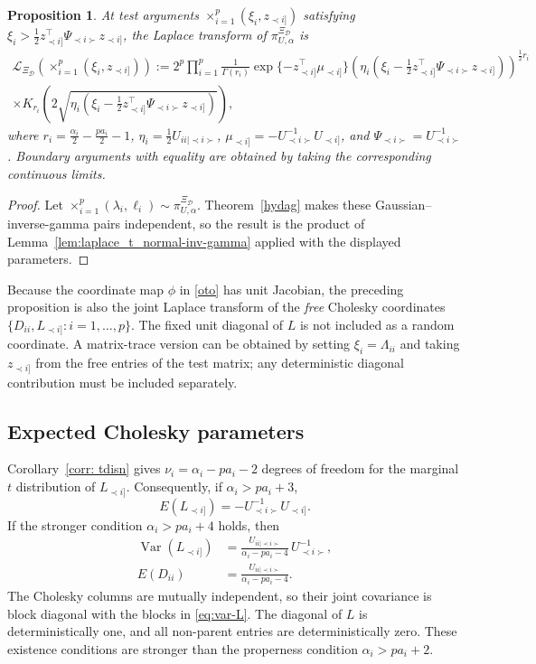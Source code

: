 \documentclass[12pt]{article}
\newcommand{\D}{\mathcal{D}}
\theoremstyle{plain}
\newtheorem{proposition}[theorem]{Proposition}
\theoremstyle{definition}
\theoremstyle{remark}
\begin{document}
\begin{proposition}
At test arguments \(\times_{i=1}^{p}(\xi_i,z_{\prec i]})\) satisfying
\(\xi_i>\tfrac12z_{\prec i]}^\top\Psi_{\prec i\succ}z_{\prec i]}\),
the Laplace transform of $\pi^{\Xi_{\D}}_{U,\alpha}$ is
\begin{eqnarray}
\mathcal{L}_{\Xi_{\D}}(\times_{i=1}^{p}(\xi_i, z_{\prec i]})):=2^{p}\prod_{i=1}^{p}   \frac{1}{\Gamma(r_{i})}\exp\{- z_{\prec i]}^{\top}\mu_{\prec i]}\}\left(\eta_{i}(\xi_{i}-\frac{1}{2}z_{\prec i]}^{\top}\Psi_{\prec i\succ} z_{\prec i]})\right)^{\frac{1}{2}r_{i}}\\
\times K_{r_{i}}\left(2\sqrt{\eta_{i}(\xi_{i}-\frac{1}{2}z_{\prec i]}^{\top}\Psi_{\prec i \succ} z_{\prec i]})}\right),
\end{eqnarray}
where $r_{i}=\frac{\alpha_{i}}{2}-\frac{pa_{i}}{2}-1$, \:
$\eta_{i}=\frac{1}{2}U_{ii| \prec i\succ}$, \:
$\mu_{\prec i]}=-U_{\prec i\succ}^{-1}U_{\prec i]}$, and \:
$\Psi_{\prec i \succ}=U_{\prec i\succ}^{-1}$.  Boundary arguments with
equality are obtained by taking the corresponding continuous limits.
\end{proposition}
\begin{proof}
Let
\(\times_{i=1}^{p}(\lambda_i,\ell_i)\sim
\pi^{\Xi_{\D}}_{U,\alpha}\).  Theorem~\ref{hydag} makes these
Gaussian--inverse-gamma pairs independent, so the result is the product
of Lemma~\ref{lem:laplace_t_normal-inv-gamma} applied with the displayed
parameters.
\end{proof}


Because the coordinate map \(\phi\) in \eqref{oto} has unit Jacobian,
the preceding proposition is also the joint Laplace transform of the
\emph{free} Cholesky coordinates
\(\{D_{ii},L_{\prec i]}:i=1,\ldots,p\}\).  The fixed unit diagonal of
\(L\) is not included as a random coordinate.  A matrix-trace version
can be obtained by setting
\(\xi_i=\Lambda_{ii}\) and taking \(z_{\prec i]}\) from the free
entries of the test matrix; any deterministic diagonal contribution
must be included separately.
%
\subsection{Expected Cholesky parameters}
Corollary~\ref{corr: tdisn} gives
\(\nu_i=\alpha_i-pa_i-2\) degrees of freedom for the marginal
\(t\) distribution of \(L_{\prec i]}\).  Consequently, if
\(\alpha_i>pa_i+3\),
\[
E(L_{\prec i]})=-U_{\prec i\succ}^{-1}U_{\prec i]}.
\]
If the stronger condition \(\alpha_i>pa_i+4\) holds, then
\begin{align}
\operatorname{Var}(L_{\prec i]})
&=\frac{U_{ii\mid\prec i\succ}}
{\alpha_i-pa_i-4}\,U_{\prec i\succ}^{-1},\label{eq:var-L}\\
E(D_{ii})
&=\frac{U_{ii\mid\prec i\succ}}
{\alpha_i-pa_i-4}.\label{eq:mean-D}
\end{align}
The Cholesky columns are mutually independent, so their joint
covariance is block diagonal with the blocks in \eqref{eq:var-L}.
The diagonal of \(L\) is deterministically one, and all non-parent
entries are deterministically zero.  These existence conditions are
stronger than the properness condition
\(\alpha_i>pa_i+2\).
\end{document}
